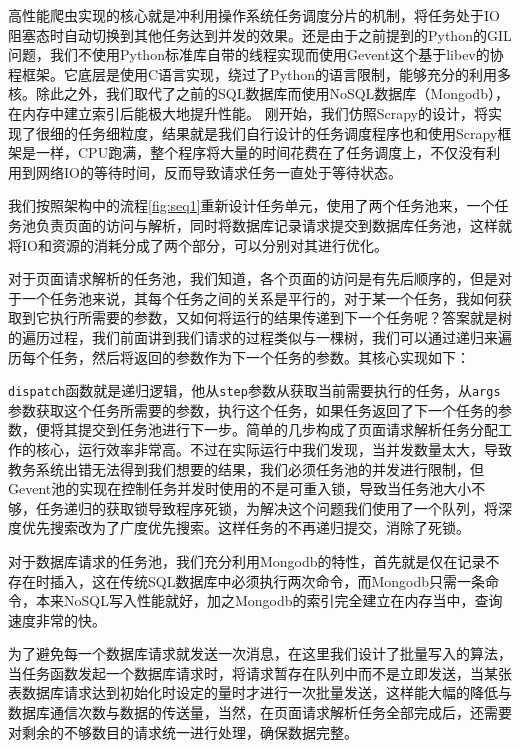\documentclass[UTF8, zihao=-4, heading=false]{ctexart}
\begin{document}
    高性能爬虫实现的核心就是冲利用操作系统任务调度分片的机制，将任务处于IO阻塞态时自动切换到其他任务达到并发的效果。还是由于之前提到的Python的GIL问题，我们不使用Python标准库自带的线程实现而使用Gevent这个基于libev的协程框架。它底层是使用C语言实现，绕过了Python的语言限制，能够充分的利用多核。除此之外，我们取代了之前的SQL数据库而使用NoSQL数据库（Mongodb），在内存中建立索引后能极大地提升性能。
    刚开始，我们仿照Scrapy的设计，将实现了很细的任务细粒度，结果就是我们自行设计的任务调度程序也和使用Scrapy框架是一样，CPU跑满，整个程序将大量的时间花费在了任务调度上，不仅没有利用到网络IO的等待时间，反而导致请求任务一直处于等待状态。\par
    我们按照架构中的流程\ref{fig:seq1}重新设计任务单元，使用了两个任务池来，一个任务池负责页面的访问与解析，同时将数据库记录请求提交到数据库任务池，这样就将IO和资源的消耗分成了两个部分，可以分别对其进行优化。\par
    对于页面请求解析的任务池，我们知道，各个页面的访问是有先后顺序的，但是对于一个任务池来说，其每个任务之间的关系是平行的，对于某一个任务，我如何获取到它执行所需要的参数，又如何将运行的结果传递到下一个任务呢？答案就是树的遍历过程，我们前面讲到我们请求的过程类似与一棵树，我们可以通过递归来遍历每个任务，然后将返回的参数作为下一个任务的参数。其核心实现如下：

    
    
    \verb|dispatch|函数就是递归逻辑，他从\verb|step|参数从获取当前需要执行的任务，从\verb|args|参数获取这个任务所需要的参数，执行这个任务，如果任务返回了下一个任务的参数，便将其提交到任务池进行下一步。简单的几步构成了页面请求解析任务分配工作的核心，运行效率非常高。不过在实际运行中我们发现，当并发数量太大，导致教务系统出错无法得到我们想要的结果，我们必须任务池的并发进行限制，但Gevent池的实现在控制任务并发时使用的不是可重入锁，导致当任务池大小不够，任务递归的获取锁导致程序死锁，为解决这个问题我们使用了一个队列，将深度优先搜索改为了广度优先搜索。这样任务的不再递归提交，消除了死锁。

      
       
    对于数据库请求的任务池，我们充分利用Mongodb的特性，首先就是仅在记录不存在时插入，这在传统SQL数据库中必须执行两次命令，而Mongodb只需一条命令，本来NoSQL写入性能就好，加之Mongodb的索引完全建立在内存当中，查询速度非常的快。\par
    为了避免每一个数据库请求就发送一次消息，在这里我们设计了批量写入的算法，当任务函数发起一个数据库请求时，将请求暂存在队列中而不是立即发送，当某张表数据库请求达到初始化时设定的量时才进行一次批量发送，这样能大幅的降低与数据库通信次数与数据的传送量，当然，在页面请求解析任务全部完成后，还需要对剩余的不够数目的请求统一进行处理，确保数据完整。\\
\end{document}
